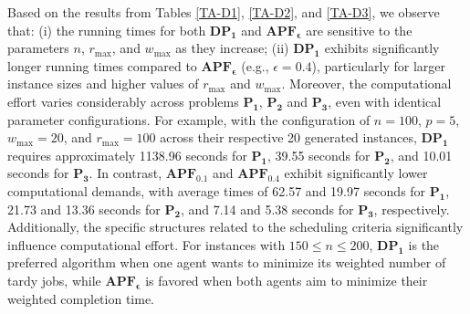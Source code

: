 \documentclass[12pt]{article}
\begin{document}
\begin{sloppypar}
Based on the results from Tables \ref{TA-D1}, \ref{TA-D2}, and \ref{TA-D3}, we observe that: (i) the running times for both  $\mathbf{DP_1}$ and $\mathbf{APF_{\epsilon}}$ are sensitive to the parameters $n$, $r_{\max}$, and $w_{\max}$ as they increase; (ii) $\mathbf{DP_1}$ exhibits significantly longer running times compared to $\mathbf{APF_{\epsilon}}$ (e.g., $\epsilon=0.4$), particularly for larger instance sizes and higher values of $r_{\max}$ and $w_{\max}$. Moreover, the computational effort varies considerably across problems $\mathbf{P_1}$, $\mathbf{P_2}$ and $\mathbf{P_3}$, even with identical parameter configurations. For example, with the configuration of $n=100$, $p=5$, $w_{\max}=20$, and $r_{\max}=100$ across their respective 20 generated instances, $\mathbf{DP_1}$ requires approximately 1138.96 seconds for $\mathbf{P_1}$, 39.55 seconds for $\mathbf{P_2}$, and 10.01 seconds for $\mathbf{P_3}$. In contrast, $\mathbf{APF_{0.1}}$ and $\mathbf{APF_{0.4}}$ exhibit significantly lower computational demands, with average times of 62.57 and 19.97 seconds for $\mathbf{P_1}$, 21.73 and 13.36 seconds for $\mathbf{P_2}$, and 7.14 and 5.38 seconds for $\mathbf{P_3}$, respectively. Additionally, the specific structures related to the scheduling criteria significantly influence computational effort. For instances with $150  \leq n \leq 200$, $\mathbf{DP_1}$ is the preferred algorithm when one agent wants to minimize its weighted number of tardy jobs, while $\mathbf{APF_{\epsilon}}$ is favored when both agents aim to minimize their weighted completion time.


\end{sloppypar}
\end{document}
